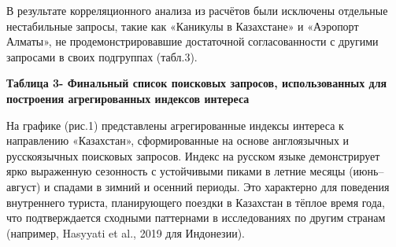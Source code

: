 В результате корреляционного анализа из расчётов были исключены
отдельные нестабильные запросы, такие как «Каникулы в Казахстане» и
«Аэропорт Алматы», не продемонстрировавшие достаточной согласованности с
другими запросами в своих подгруппах (табл.3).

{\bfseries Таблица 3- Финальный список поисковых запросов, использованных
для построения агрегированных индексов интереса}


На графике (рис.1) представлены агрегированные индексы интереса к
направлению «Казахстан», сформированные на основе англоязычных и
русскоязычных поисковых запросов. Индекс на русском языке демонстрирует
ярко выраженную сезонность с устойчивыми пиками в летние месяцы
(июнь--август) и спадами в зимний и осенний периоды. Это характерно для
поведения внутреннего туриста, планирующего поездки в Казахстан в тёплое
время года, что подтверждается сходными паттернами в исследованиях по
другим странам (например, Hasyyati et al., 2019 для Индонезии).

